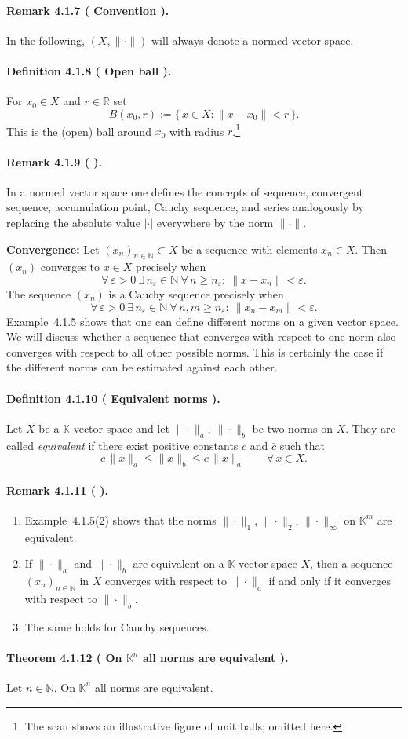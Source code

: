 \documentclass[12pt]{article}
\newcommand{\N}{\mathbb{N}}
\newcommand{\R}{\mathbb{R}}
\newcommand{\K}{\mathbb{K}} %
\newcommand{\eps}{\varepsilon}
\newcommand{\NumberedDefinition}[3]{%
\paragraph*{Definition #1 ( #2 ).} #3\par}
\newcommand{\NumberedTheorem}[3]{%
\paragraph*{Theorem #1 ( #2 ).} #3\par}
\newcommand{\NumberedRemark}[3]{%
\paragraph*{Remark #1 ( #2 ).} #3\par}
\begin{document}
	\NumberedRemark{4.1.7}{Convention}{In the following, $(X,\|\cdot\|)$ will always denote a normed vector space.}

	\NumberedDefinition{4.1.8}{Open ball}{For $x_0\in X$ and $r\in\R$ set
	\[
		B(x_0,r) := \{\, x\in X : \|x - x_0\| < r \,\}.
	\]
	This is the (open) ball around $x_0$ with radius $r$.\footnote{The scan shows an illustrative figure of unit balls; omitted here.}}

	\NumberedRemark{4.1.9}{}{In a normed vector space one defines the concepts of sequence, convergent sequence, accumulation point, Cauchy sequence, and series analogously by replacing the absolute value $|\cdot|$ everywhere by the norm $\|\cdot\|$.

	\textbf{Convergence:} Let $(x_n)_{n\in\N}\subset X$ be a sequence with elements $x_n\in X$. Then $(x_n)$ converges to $x\in X$ precisely when
	\[
		\forall\,\eps>0\ \exists\, n_\eps\in\N\ \forall\, n\ge n_\eps:\ \|x - x_n\| < \eps.
	\]
	The sequence $(x_n)$ is a Cauchy sequence precisely when
	\[
		\forall\,\eps>0\ \exists\, n_\eps\in\N\ \forall\, n,m\ge n_\eps:\ \|x_n - x_m\| < \eps.
	\]
	Example~4.1.5 shows that one can define different norms on a given vector space. We will discuss whether a sequence that converges with respect to one norm also converges with respect to all other possible norms. This is certainly the case if the different norms can be estimated against each other.}

	\NumberedDefinition{4.1.10}{Equivalent norms}{Let $X$ be a $\K$-vector space and let $\|\cdot\|_a,\ \|\cdot\|_b$ be two norms on $X$. They are called \emph{equivalent} if there exist positive constants $c$ and $\bar c$ such that
	\[
		c\,\|x\|_a \le \|x\|_b \le \bar c\,\|x\|_a \qquad \forall\, x\in X.
	\]}

	\NumberedRemark{4.1.11}{}{\begin{enumerate}[label={(\arabic*)}, leftmargin=*]
		\item Example~4.1.5(2) shows that the norms $\|\cdot\|_1$, $\|\cdot\|_2$, $\|\cdot\|_\infty$ on $\K^{m}$ are equivalent.
		\item If $\|\cdot\|_a$ and $\|\cdot\|_b$ are equivalent on a $\K$-vector space $X$, then a sequence $(x_n)_{n\in\N}$ in $X$ converges with respect to $\|\cdot\|_a$ if and only if it converges with respect to $\|\cdot\|_b$.
		\item The same holds for Cauchy sequences.
	\end{enumerate}}

	\NumberedTheorem{4.1.12}{On $\K^{n}$ all norms are equivalent}{Let $n\in\N$. On $\K^{n}$ all norms are equivalent.}
\end{document}
